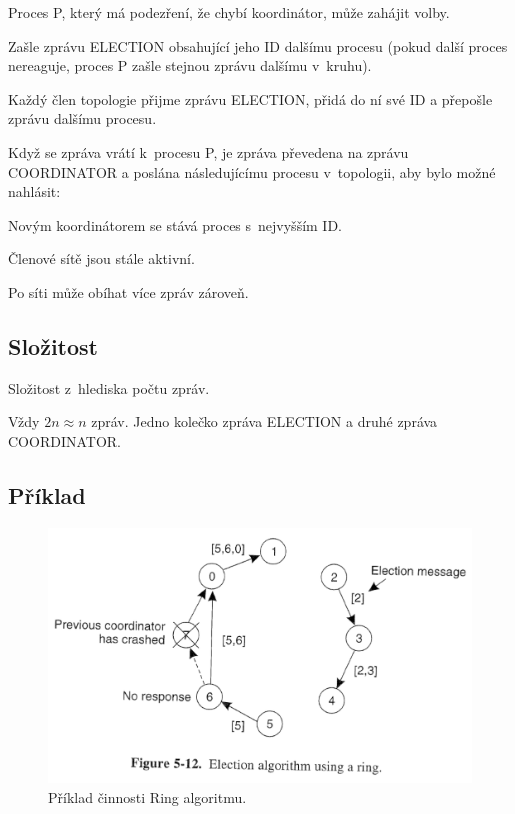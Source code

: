 \begin{compactitem}
    \item Proces P, který má podezření, že chybí koordinátor, může zahájit volby.
    \begin{compactenum}
        \item Zašle zprávu ELECTION obsahující jeho ID dalšímu procesu (pokud další proces nereaguje, proces P zašle stejnou zprávu dalšímu v~kruhu).
        \item Každý člen topologie přijme zprávu ELECTION, přidá do ní své ID a přepošle zprávu dalšímu procesu.
    \end{compactenum}
    \item Když se zpráva vrátí k~procesu P, je zpráva převedena na zprávu  COORDINATOR a poslána následujícímu procesu v~topologii, aby bylo možné nahlásit:
    \begin{compactenum}
        \item Novým koordinátorem se stává proces s~nejvyšším ID.
        \item Členové sítě jsou stále aktivní.
    \end{compactenum}
    \item Po síti může obíhat více zpráv zároveň.
\end{compactitem}

\subsection{Složitost}

Složitost z~hlediska počtu zpráv.

\bigskip\noindent Vždy $2n \approx n$ zpráv. Jedno kolečko  zpráva ELECTION a druhé zpráva COORDINATOR.

\subsection{Příklad}

\begin{figure}[H]
    \centering
    \includegraphics[width=1\linewidth]{example_ring.pdf}
    \caption{Příklad činnosti Ring algoritmu.}
\end{figure}

